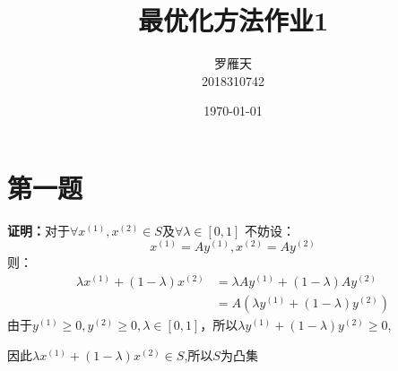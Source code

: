 \documentclass[a4paper]{article}
\title{最优化方法作业1}
\author{罗雁天 \\
2018310742}
\date{\today}
\begin{document}
\maketitle

\section{第一题}
\textbf{证明：}对于$\forall x^{(1)},x^{(2)}\in S$及$\forall \lambda \in [0,1]$
不妨设：
\begin{equation}
x^{(1)}=Ay^{(1)},x^{(2)}=Ay^{(2)}
\end{equation}
则：
\begin{equation}
\begin{aligned}
\lambda x^{(1)} + (1-\lambda)x^{(2)} &= \lambda A y^{(1)} + (1-\lambda) A y^{(2)} \\
&= A(\lambda y^{(1)}+(1-\lambda) y^{(2)}) 
\end{aligned}
\end{equation}
由于$y^{(1)}\ge 0,y^{(2)}\ge 0,\lambda \in [0,1]$，所以$\lambda y^{(1)}+(1-\lambda) y^{(2)}\ge 0$,

因此$\lambda x^{(1)} + (1-\lambda)x^{(2)}\in S$,所以$S$为凸集
\end{document}
